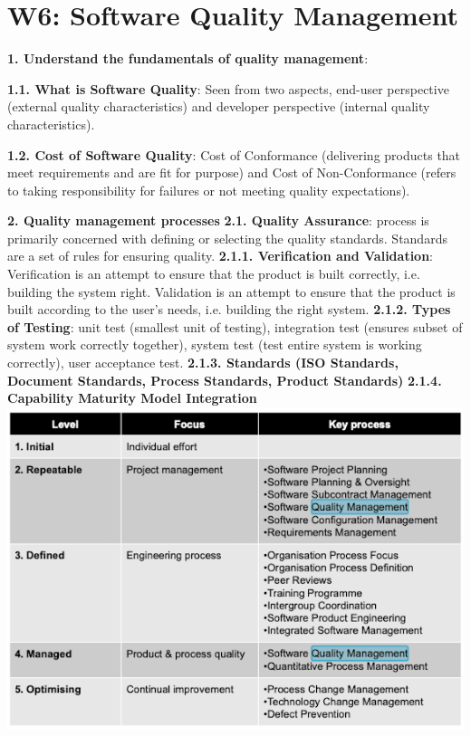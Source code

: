 \section{W6: Software Quality Management}

\textbf{1. Understand the fundamentals of quality management}: 

    \textbf{1.1. What is Software Quality}: Seen from two aspects, end-user perspective (external quality characteristics) and developer perspective (internal quality characteristics). 

    \textbf{1.2. Cost of Software Quality}: Cost of Conformance (delivering products that meet requirements and are fit for purpose) and Cost of Non-Conformance (refers to taking responsibility for failures or not meeting quality expectations).

\textbf{2. Quality management processes}
    \textbf{2.1. Quality Assurance}: process is primarily concerned with defining or selecting the quality standards. Standards are a set of rules for ensuring quality.
        \textbf{2.1.1. Verification and Validation}: Verification is an attempt to ensure that the product is built correctly, i.e. building the system right. Validation is an attempt to ensure that the product is built according to the user's needs, i.e. building the right system.
        \textbf{2.1.2. Types of Testing}: unit test (smallest unit of testing), integration test (ensures subset of system work correctly together), system test (test entire system is working correctly), user acceptance test.
        \textbf{2.1.3. Standards (ISO Standards, Document Standards, Process Standards, Product Standards)}
        \textbf{2.1.4. Capability Maturity Model Integration}
        \includegraphics[width=\linewidth]{figs/SCR-20240606-orfm.png}
